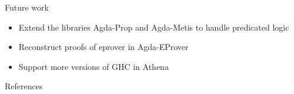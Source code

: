 \documentclass[hyperref={pdfpagelabels=false}]{beamer}
\begin{document}
\begin{frame}{Future work}

  \begin{itemize}
  \item
    Extend the libraries Agda-Prop and Agda-Metis to handle predicated logic
  \item
    Reconstruct proofs of eprover in Agda-EProver
  \item
    Support more versions of GHC in Athena
  \end{itemize}

\end{frame}


\begin{frame}{References}

\end{frame}
\end{document}
